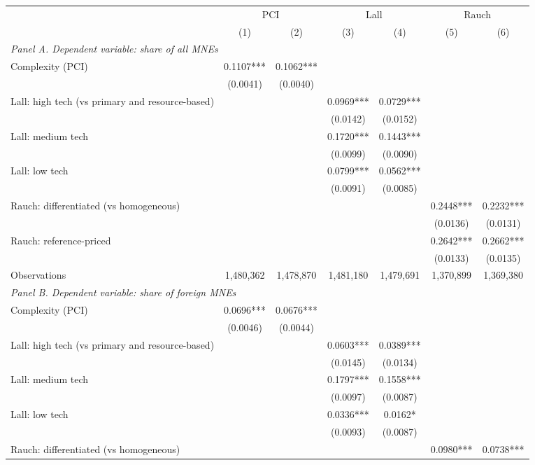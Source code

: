 \begin{tabular}{lcccccc} \hline
 & \multicolumn{2}{c}{PCI} & \multicolumn{2}{c}{Lall} & \multicolumn{2}{c}{Rauch} \\
 & (1) & (2) & (3) & (4) & (5) & (6) \\ \hline
\multicolumn{7}{l}{\textit{Panel A. Dependent variable: share of all MNEs}} \\
Complexity (PCI) & 0.1107*** & 0.1062*** &  &  &  &  \\
 & (0.0041) & (0.0040) &  &  &  &  \\
Lall: high tech (vs primary and resource-based) &  &  & 0.0969*** & 0.0729*** &  &  \\
 &  &  & (0.0142) & (0.0152) &  &  \\
Lall: medium tech &  &  & 0.1720*** & 0.1443*** &  &  \\
 &  &  & (0.0099) & (0.0090) &  &  \\
Lall: low tech &  &  & 0.0799*** & 0.0562*** &  &  \\
 &  &  & (0.0091) & (0.0085) &  &  \\
Rauch: differentiated (vs homogeneous) &  &  &  &  & 0.2448*** & 0.2232*** \\
 &  &  &  &  & (0.0136) & (0.0131) \\
Rauch: reference-priced &  &  &  &  & 0.2642*** & 0.2662*** \\
 &  &  &  &  & (0.0133) & (0.0135) \\
Observations & 1,480,362 & 1,478,870 & 1,481,180 & 1,479,691 & 1,370,899 & 1,369,380 \\
\midrule
\multicolumn{7}{l}{\textit{Panel B. Dependent variable: share of foreign MNEs}} \\
Complexity (PCI) & 0.0696*** & 0.0676*** &  &  &  &  \\
 & (0.0046) & (0.0044) &  &  &  &  \\
Lall: high tech (vs primary and resource-based) &  &  & 0.0603*** & 0.0389*** &  &  \\
 &  &  & (0.0145) & (0.0134) &  &  \\
Lall: medium tech &  &  & 0.1797*** & 0.1558*** &  &  \\
 &  &  & (0.0097) & (0.0087) &  &  \\
Lall: low tech &  &  & 0.0336*** & 0.0162* &  &  \\
 &  &  & (0.0093) & (0.0087) &  &  \\
Rauch: differentiated (vs homogeneous) &  &  &  &  & 0.0980*** & 0.0738*** \\

\end{tabular}
